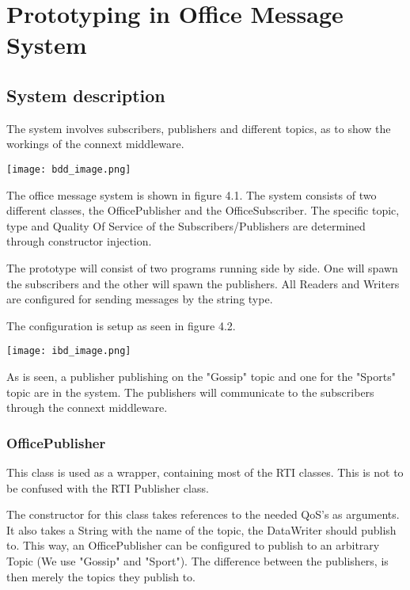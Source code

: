 \chapter{Prototyping in Office Message System}

\section{System description}
The system involves subscribers, publishers and different topics, as to show the workings of the connext middleware. 

\begin{center}
	\texttt{[image: bdd\_image.png]}
\end{center}

The office message system is shown in figure 4.1. The system consists of two different classes, the OfficePublisher and the OfficeSubscriber. The specific topic, type and Quality Of Service of the Subscribers/Publishers are determined through constructor injection.

The prototype will consist of two programs running side by side. One will spawn the subscribers and the other will spawn the publishers. All Readers and Writers are configured for sending messages by the string type. 

The configuration is setup as seen in figure 4.2.

\begin{center}
	\texttt{[image: ibd\_image.png]}
\end{center}

As is seen, a publisher publishing on the "Gossip" topic and one for the "Sports" topic are in the system. The publishers will communicate to the subscribers through the connext middleware.

\subsection{OfficePublisher}
This class is used as a wrapper, containing most of the RTI classes. This is not to be confused with the RTI Publisher class. 

The constructor for this class takes references to the needed QoS's as arguments. It also takes a String with the name of the topic, the DataWriter should publish to. This way, an OfficePublisher can be configured to publish to an arbitrary Topic (We use "Gossip" and "Sport"). The difference between the publishers, is then merely the topics they publish to.

